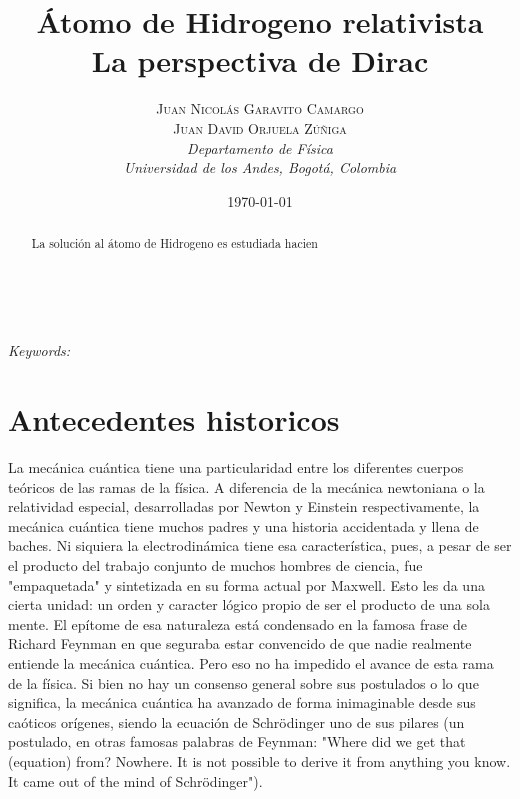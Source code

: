 \documentclass[a4paper, 12pt]{article} %
\title{\textbf{\'Atomo de Hidrogeno relativista}\\ %
La perspectiva de Dirac} %
\author{\textsc{Juan Nicol\'as Garavito Camargo \\ Juan David Orjuela Z\'u\~niga} %
\\{\textit{Departamento de F\'isica\\}
\textit{Universidad de los Andes, Bogot\'a, Colombia}}} %
\date{\today} %
\makeatletter
\renewcommand{\maketitle}{ %
\begin{flushright} %
{\LARGE\@title} %

\vspace{50pt} %

{\large\@author} %
\\\@date %

\vspace{40pt} %
\end{flushright}
}
\makeatother
\begin{document}
\maketitle %



\begin{abstract}
La soluci\'on al \'atomo de Hidrogeno es estudiada hacien
\end{abstract}
\hspace*{3,6mm}\textit{Keywords:}  %

\vspace{30pt} %


\section{Antecedentes historicos}


La mec\'anica cu\'antica tiene una particularidad entre los diferentes cuerpos te\'oricos de las ramas de la f\'isica. A diferencia de la mec\'anica newtoniana o la relatividad especial, desarrolladas por Newton y Einstein respectivamente, la mec\'anica cu\'antica tiene muchos padres y una historia accidentada y llena de baches. Ni siquiera la electrodin\'amica tiene esa caracter\'istica, pues, a pesar de ser el producto del trabajo conjunto de muchos hombres de ciencia, fue "empaquetada" y sintetizada en su forma actual por Maxwell. Esto les da una cierta unidad: un orden y caracter l\'ogico propio de ser el producto de una sola mente. El ep\'itome de esa naturaleza est\'a condensado en la famosa frase de Richard Feynman en que seguraba estar convencido de que nadie realmente entiende la mec\'anica cu\'antica. Pero eso no ha impedido el avance de esta rama de la f\'isica. Si bien no hay un consenso general sobre sus postulados o lo que significa, la mec\'anica cu\'antica ha avanzado de forma inimaginable desde sus ca\'oticos or\'igenes, siendo la ecuaci\'on de Schr\"odinger uno de sus pilares (un postulado, en otras famosas palabras de Feynman: "Where did we get that (equation) from? Nowhere. It is not possible to derive it from anything you know. It came out of the mind of Schr\"odinger").
\end{document}
